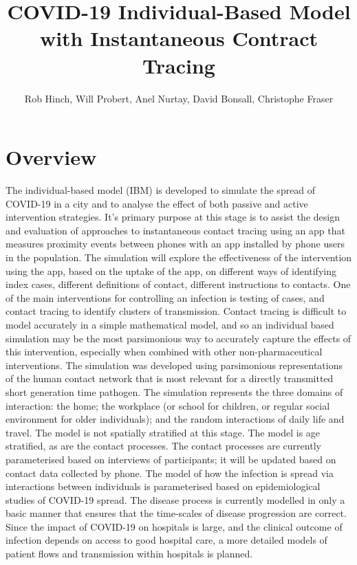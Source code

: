 \documentclass[12pt, oneside]{amsart}   	%
\title{COVID-19 Individual-Based Model  with Instantaneous Contract Tracing}
\author{Rob Hinch, Will Probert, Anel Nurtay, David Bonsall, Christophe Fraser}
\begin{document}
\maketitle
\tableofcontents

\section{Overview} \label{section_ibm_overview}
The individual-based model (IBM) is developed to simulate the spread of COVID-19 in a city and to analyse the effect of both passive and active intervention strategies.
It's primary purpose at this stage is to assist the design and evaluation of approaches to instantaneous contact tracing using an app that measures proximity events between phones with an app installed by phone users in the population.
The simulation will explore the effectiveness of the intervention using the app, based on the uptake of the app, on different ways of identifying index cases, different definitions of contact, different instructions to contacts.  
One of the main interventions for controlling an infection is testing of cases, and contact tracing to identify clusters of transmission. 
Contact tracing is difficult to model accurately in a simple mathematical model, and so an individual based simulation may be the most parsimonious way to accurately capture the effects of this intervention, especially when combined with other non-pharmaceutical interventions. 
The simulation was developed using parsimonious representations of the human contact network that is most relevant for a directly transmitted short generation time pathogen.
The simulation represents the three domains of interaction: the home; the workplace (or school for children, or regular social environment for older individuals); and the random interactions of daily life and travel.
The model is not spatially stratified at this stage.
The model is age stratified, as are the contact processes.
The contact processes are currently parameterised based on interviews of participants; it will be updated based on contact data collected by phone.  
The model of how the infection is spread via interactions between individuals is parameterised based on epidemiological studies of COVID-19 spread.
The disease process is currently modelled in only a basic manner that ensures that the time-scales of disease progression are correct. 
Since the impact of COVID-19 on hospitals is large, and the clinical outcome of infection depends on access to good hospital care, a more detailed models of patient flows and transmission within hospitals is planned. 
\end{document}
